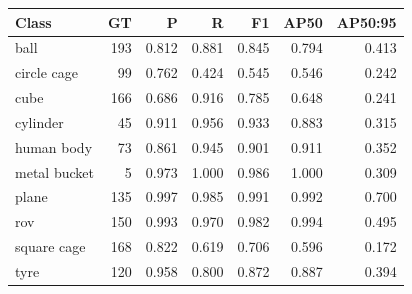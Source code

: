 \begin{tabular}{lrrrrrr}
\toprule
Class & GT & P & R & F1 & AP50 & AP50:95 \\
\midrule
ball & 193 & 0.812 & 0.881 & 0.845 & 0.794 & 0.413 \\
circle cage & 99 & 0.762 & 0.424 & 0.545 & 0.546 & 0.242 \\
cube & 166 & 0.686 & 0.916 & 0.785 & 0.648 & 0.241 \\
cylinder & 45 & 0.911 & 0.956 & 0.933 & 0.883 & 0.315 \\
human body & 73 & 0.861 & 0.945 & 0.901 & 0.911 & 0.352 \\
metal bucket & 5 & 0.973 & 1.000 & 0.986 & 1.000 & 0.309 \\
plane & 135 & 0.997 & 0.985 & 0.991 & 0.992 & 0.700 \\
rov & 150 & 0.993 & 0.970 & 0.982 & 0.994 & 0.495 \\
square cage & 168 & 0.822 & 0.619 & 0.706 & 0.596 & 0.172 \\
tyre & 120 & 0.958 & 0.800 & 0.872 & 0.887 & 0.394 \\
\bottomrule
\end{tabular}
